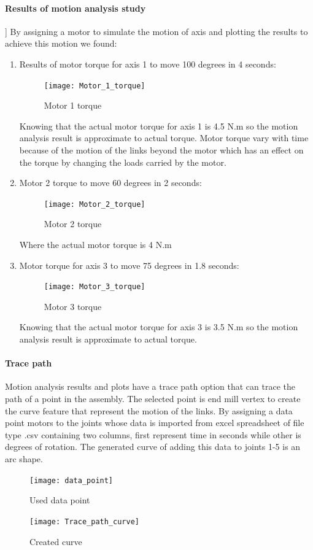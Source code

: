 \bigskip
\paragraph{Results of motion analysis study}] 
By assigning a motor to simulate the motion of axis and plotting the results to achieve this motion we found:
\begin{enumerate}
	\item Results of motor torque for axis 1 to move 100 degrees in 4 seconds:

	\begin{figure}[H]
		\centering
		\texttt{[image: Motor\_1\_torque]}
		\caption{Motor 1 torque}
	\end{figure}
	
	\smallskip
Knowing that the actual motor torque for axis 1 is 4.5 N.m so the motion analysis result is approximate to actual torque. 
\newline Motor torque vary with time because of the motion of the links beyond the motor which has an effect on the torque by changing the loads carried by the motor.
\smallskip
	\item Motor 2 torque to move 60 degrees in 2 seconds:
	\begin{figure}[H]
		\centering
		\texttt{[image: Motor\_2\_torque]}
		\caption{Motor 2 torque}
	\end{figure}
	
	Where the actual motor torque is 4 N.m

\smallskip
	\item Motor torque for axis 3 to move 75 degrees in 1.8 seconds:
	\begin{figure}[H]
		\centering
		\texttt{[image: Motor\_3\_torque]}
		\caption{Motor 3 torque}
	\end{figure}
	
	Knowing that the actual motor torque for axis 3 is 3.5 N.m so the motion analysis result is approximate to actual torque.
\end{enumerate}

\bigskip
\paragraph{Trace path}
Motion analysis results and plots have a trace path option that can trace the path of a point in the assembly. The selected point is end mill vertex to create the curve feature that represent the motion of the links.  By assigning a data point motors to the joints whose data is imported from excel spreadsheet of file type .csv containing two columns, first represent time in seconds while other is degrees of rotation. The generated curve of adding this data to joints 1-5 is an arc shape.

\begin{figure}[H]
	\centering
	\texttt{[image: data\_point]}
	\caption{Used data point}
\end{figure}

\begin{figure}[H]
	\centering
	\texttt{[image: Trace\_path\_curve]}
	\caption{Created curve}
\end{figure}

%
%    